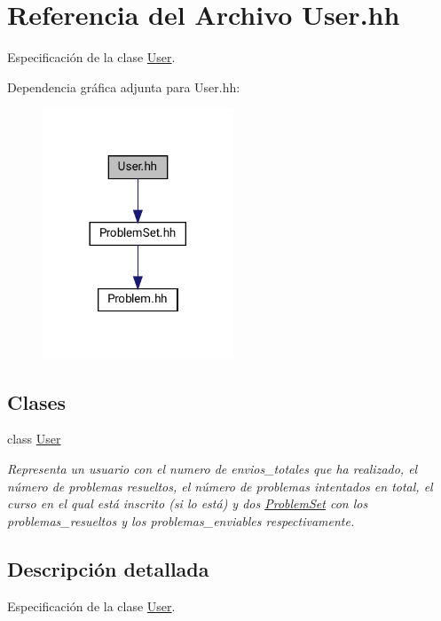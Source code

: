 \hypertarget{_user_8hh}{}\section{Referencia del Archivo User.\+hh}
\label{_user_8hh}


Especificación de la clase \mbox{\hyperlink{class_user}{User}}.  


Dependencia gráfica adjunta para User.\+hh\+:\nopagebreak
\begin{figure}[H]
\begin{center}
\leavevmode
\includegraphics[width=161pt]{_user_8hh__incl}
\end{center}
\end{figure}
\subsection*{Clases}
\begin{DoxyCompactItemize}
\item 
class \mbox{\hyperlink{class_user}{User}}
\begin{DoxyCompactList}\small\item\em Representa un usuario con el numero de envios\+\_\+totales que ha realizado, el número de problemas resueltos, el número de problemas intentados en total, el curso en el qual está inscrito (si lo está) y dos \mbox{\hyperlink{class_problem_set}{Problem\+Set}} con los problemas\+\_\+resueltos y los problemas\+\_\+enviables respectivamente. \end{DoxyCompactList}\end{DoxyCompactItemize}


\subsection{Descripción detallada}
Especificación de la clase \mbox{\hyperlink{class_user}{User}}. 


